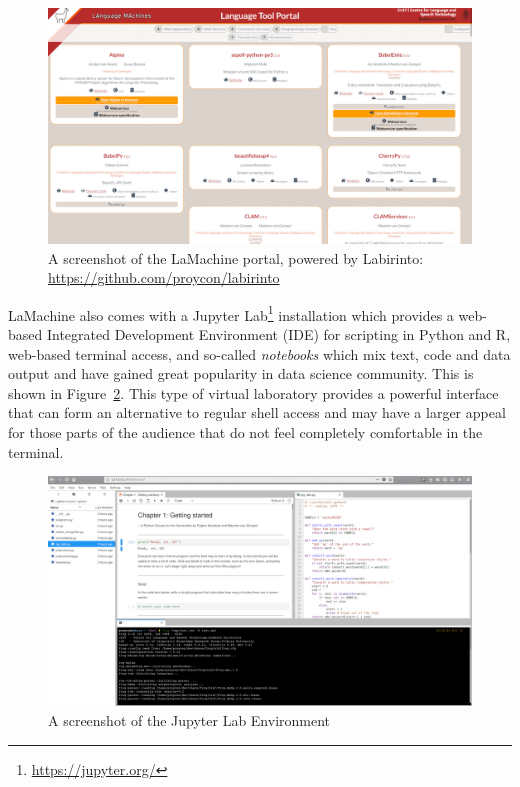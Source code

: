 \documentclass[a4paper,11pt]{article}
\begin{document}
\begin{figure}[htb] \begin{center}
\includegraphics[width=135.0mm]{screenshot_portal.jpg}
\end{center}
\caption{\footnotesize{A screenshot of the LaMachine portal, powered by Labirinto:
\url{https://github.com/proycon/labirinto}}}
\label{fig:portal}
\end{figure}

LaMachine also comes with a
Jupyter Lab\footnote{\url{https://jupyter.org/}} installation which provides a web-based Integrated Development
Environment (IDE) for scripting in Python and R, web-based terminal access, and so-called \emph{notebooks} which mix
text, code and data output and have gained great popularity in data science community. This is shown in
Figure~\ref{fig:lab}. This type of virtual laboratory provides a powerful interface that can form an alternative to
regular shell access and may have a larger appeal for those parts of the audience that do not feel completely
comfortable in the terminal.

\begin{figure}[htb] \begin{center}
\includegraphics[width=135.0mm]{screenshot_lab.jpg}
\end{center}
\caption{\footnotesize{A screenshot of the Jupyter Lab Environment}}
\label{fig:lab}
\end{figure}
\end{document}

